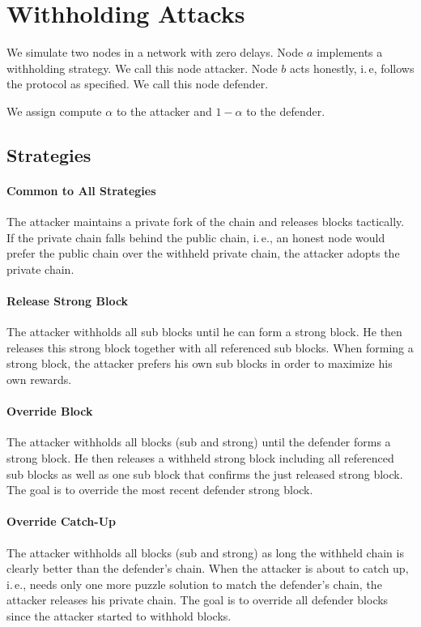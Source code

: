 \documentclass{article}
\begin{document}
\section{Withholding Attacks}

We simulate two nodes in a network with zero delays.
Node $a$ implements a withholding strategy.
We call this node attacker.
Node $b$ acts honestly, i.\,e, follows the protocol as specified.
We call this node defender.

We assign compute $\alpha$ to the attacker and $1-\alpha$ to the defender.

\subsection{Strategies}

\paragraph{Common to All Strategies}
The attacker maintains a private fork of the chain and releases blocks tactically.
If the private chain falls behind the public chain, i.\,e., an honest node would prefer the public chain over the withheld private chain, the attacker adopts the private chain.

\paragraph{Release Strong Block}
The attacker withholds all sub blocks until he can form a strong block.
He then releases this strong block together with all referenced sub blocks.
When forming a strong block, the attacker prefers his own sub blocks in order to maximize his own rewards.

\paragraph{Override Block}
The attacker withholds all blocks (sub and strong) until the defender forms a strong block.
He then releases a withheld strong block including all referenced sub blocks as well as one sub block that confirms the just released strong block.
The goal is to override the most recent defender strong block.

\paragraph{Override Catch-Up}
The attacker withholds all blocks (sub and strong) as long the withheld chain is clearly better than the defender's chain.
When the attacker is about to catch up, i.\,e., needs only one more puzzle solution to match the defender's chain, the attacker releases his private chain.
The goal is to override all defender blocks since the attacker started to withhold blocks.
\end{document}
